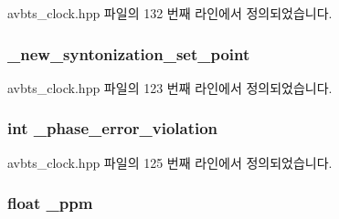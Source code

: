 avbts\+\_\+clock.\+hpp 파일의 132 번째 라인에서 정의되었습니다.

\subsubsection[{\texorpdfstring{\+\_\+new\+\_\+syntonization\+\_\+set\+\_\+point}{_new_syntonization_set_point}}]{ \+\_\+new\+\_\+syntonization\+\_\+set\+\_\+point\hspace{0.3cm}{\ttfamily [private]}}\hypertarget{class_i_e_e_e1588_clock_a072a8e01c4846e8dac776efb649eecaa}{}\label{class_i_e_e_e1588_clock_a072a8e01c4846e8dac776efb649eecaa}


avbts\+\_\+clock.\+hpp 파일의 123 번째 라인에서 정의되었습니다.

\subsubsection[{\texorpdfstring{\+\_\+phase\+\_\+error\+\_\+violation}{_phase_error_violation}}]{\setlength{\rightskip}{0pt plus 5cm}int \+\_\+phase\+\_\+error\+\_\+violation\hspace{0.3cm}{\ttfamily [private]}}\hypertarget{class_i_e_e_e1588_clock_a25a69327f1634dd59c4bee36a4d3007b}{}\label{class_i_e_e_e1588_clock_a25a69327f1634dd59c4bee36a4d3007b}


avbts\+\_\+clock.\+hpp 파일의 125 번째 라인에서 정의되었습니다.

\subsubsection[{\texorpdfstring{\+\_\+ppm}{_ppm}}]{\setlength{\rightskip}{0pt plus 5cm}float \+\_\+ppm\hspace{0.3cm}{\ttfamily [private]}}\hypertarget{class_i_e_e_e1588_clock_ae061efd6b04ce63dbc4c48b9bb1d3002}{}\label{class_i_e_e_e1588_clock_ae061efd6b04ce63dbc4c48b9bb1d3002}



